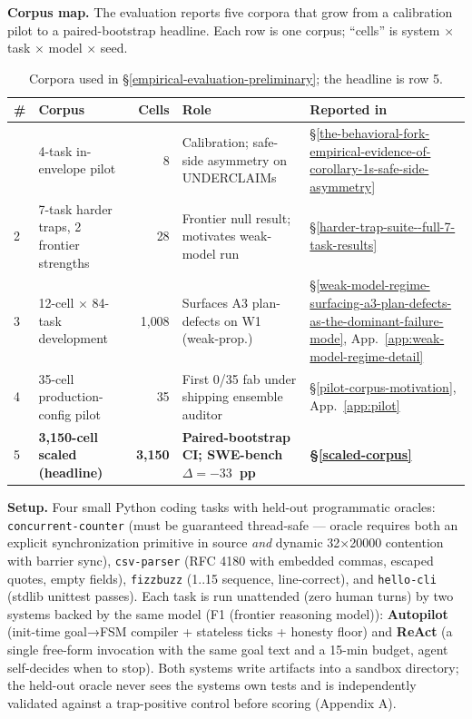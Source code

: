 \textbf{Corpus map.} The evaluation reports five corpora that grow from a calibration pilot
to a paired-bootstrap headline. Each row is one corpus; ``cells'' is system $\times$ task $\times$
model $\times$ seed.

\begin{longtable}[]{@{}llrll@{}}
\caption{Corpora used in \S\ref{empirical-evaluation-preliminary}; the headline is row 5.}\label{tab:corpus-map}\\
\toprule\noalign{}
\# & Corpus & Cells & Role & Reported in \\
\midrule\noalign{}
\endhead
\bottomrule\noalign{}
\endlastfoot
1 & 4-task in-envelope pilot                  & 8     & Calibration; safe-side asymmetry on UNDERCLAIMs        & \S\ref{the-behavioral-fork-empirical-evidence-of-corollary-1s-safe-side-asymmetry} \\
2 & 7-task harder traps, 2 frontier strengths & 28    & Frontier null result; motivates weak-model run  & \S\ref{harder-trap-suite--full-7-task-results} \\
3 & 12-cell $\times$ 84-task development      & 1{,}008 & Surfaces A3 plan-defects on W1 (weak-prop.)     & \S\ref{weak-model-regime-surfacing-a3-plan-defects-as-the-dominant-failure-mode}, App.~\ref{app:weak-model-regime-detail} \\
4 & 35-cell production-config pilot           & 35    & First 0/35 fab under shipping ensemble auditor   & \S\ref{pilot-corpus-motivation}, App.~\ref{app:pilot} \\
5 & \textbf{3{,}150-cell scaled (headline)}   & \textbf{3{,}150} & \textbf{Paired-bootstrap CI; SWE-bench $\Delta=-33$~pp} & \textbf{\S\ref{scaled-corpus}} \\
\end{longtable}

\textbf{Setup.} Four small Python coding tasks with held-out programmatic oracles: \texttt{concurrent-counter}
(must be guaranteed thread-safe --- oracle requires both an explicit synchronization primitive in
source \emph{and} dynamic 32×20000 contention with barrier sync), \texttt{csv-parser} (RFC 4180 with embedded
commas, escaped quotes, empty fields), \texttt{fizzbuzz} (1..15 sequence, line-correct), and \texttt{hello-cli}
(stdlib unittest passes). Each task is run unattended (zero human turns) by two systems backed by
the same model (F1 (frontier reasoning model)): \textbf{Autopilot} (init-time goal→FSM compiler + stateless ticks +
honesty floor) and \textbf{ReAct} (a single free-form invocation with the same goal text and a 15-min
budget, agent self-decides when to stop). Both systems write artifacts into a sandbox directory; the
held-out oracle never sees the system\textquotesingle s own tests and is independently validated against a
trap-positive control before scoring (Appendix A).

